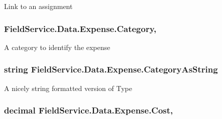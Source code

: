 Link to an assignment 

\hypertarget{class_field_service_1_1_data_1_1_expense_adf4d52782e255df6159d3875107a36e9}{
\subsubsection[{Category}]{ Field\+Service.\+Data.\+Expense.\+Category\hspace{0.3cm}{\ttfamily [get]}, {\ttfamily [set]}}}\label{class_field_service_1_1_data_1_1_expense_adf4d52782e255df6159d3875107a36e9}


A category to identify the expense 

\hypertarget{class_field_service_1_1_data_1_1_expense_a25af4c85b63dfb53ef00e618c4967c4c}{
\subsubsection[{Category\+As\+String}]{\setlength{\rightskip}{0pt plus 5cm}string Field\+Service.\+Data.\+Expense.\+Category\+As\+String\hspace{0.3cm}{\ttfamily [get]}}}\label{class_field_service_1_1_data_1_1_expense_a25af4c85b63dfb53ef00e618c4967c4c}


A nicely string formatted version of Type 

\hypertarget{class_field_service_1_1_data_1_1_expense_ae348a76981516e1e6345edcd88ab1821}{
\subsubsection[{Cost}]{\setlength{\rightskip}{0pt plus 5cm}decimal Field\+Service.\+Data.\+Expense.\+Cost\hspace{0.3cm}{\ttfamily [get]}, {\ttfamily [set]}}}\label{class_field_service_1_1_data_1_1_expense_ae348a76981516e1e6345edcd88ab1821}



